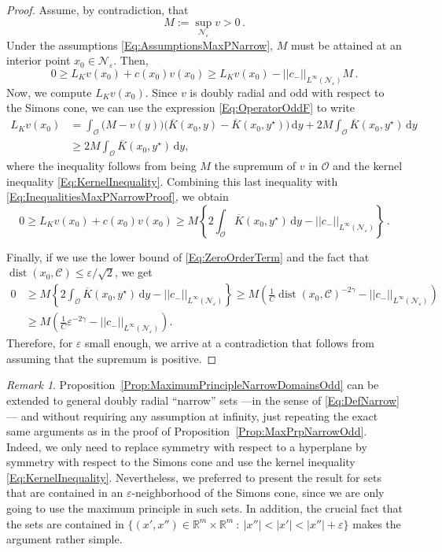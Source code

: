 \documentclass[12pt,reqno]{amsart}
\theoremstyle{definition}
\theoremstyle{remark}
\newtheorem{remark}[theorem]{Remark}
\newcommand{\con}[1]{\mathbb{#1}}
\newcommand{\R}{\con{R}} %
\newcommand{\ccal}{\mathscr{C}}
\newcommand{\ncal}{\mathcal{N}}
\newcommand{\ocal}{\mathcal{O}}
\newcommand{\norm}[1]{\left | \left |{#1} \right | \right |}
\newcommand{\s}{\gamma}
\renewcommand{\d}{\,\mathrm{d}} %
\DeclareMathOperator{\dist}{dist}
\numberwithin{equation}{section}
\begin{document}
\begin{proof}
	Assume, by contradiction, that
	$$
	M := \sup_{\ncal_\varepsilon} v > 0\,.
	$$
	Under the assumptions \eqref{Eq:AssumptionsMaxPNarrow}, $M$ must be attained at an interior point $x_0 \in \ncal_\varepsilon$. Then,
	\begin{equation}
	\label{Eq:InequalitiesMaxPNarrowProof}
	0 \geq L_K  v(x_0) + c(x_0)v(x_0) \geq L_K  v(x_0) - \norm{c_-}_{L^\infty(\ncal_\varepsilon)}M\,.
	\end{equation} 
	Now, we compute $L_K  v(x_0)$. Since $v$ is doubly radial and odd with respect to the Simons cone, we can use the expression \eqref{Eq:OperatorOddF} to write
	\begin{align*}
	L_K v(x_0) &= \int_{\ocal} \big (M - v(y) \big) \big (\overline{K}(x_0,y) -\overline{K}(x_0,y^\star)\big) \d y + 2M\int_{\ocal} \overline{K}(x_0,y^\star)\d y\\
	&\geq2M \int_{\ocal} \overline{K}(x_0,y^\star)\d y,
	\end{align*}
	where the inequality follows from being $M$ the supremum of $v$ in $\ocal$ and the kernel inequality \eqref{Eq:KernelInequality}. Combining this last inequality with \eqref{Eq:InequalitiesMaxPNarrowProof}, we obtain
	$$
	0 \geq L_K  v(x_0) + c(x_0)v(x_0)  \geq M \left\{ 2 \int_{\ocal} \overline{K}(x_0,y^\star)\d y - \norm{c_-}_{L^\infty(\ncal_\varepsilon)}
	\right\}\,.
	$$
	
	Finally, if we use the lower bound of \eqref{Eq:ZeroOrderTerm} and the fact that $\dist(x_0,\ccal) \leq \varepsilon/\sqrt{2}$, we get
	\begin{align*}
	0 &\geq M \left\{ 2 \int_{\ocal} \overline{K}(x_0,y^\star)\d y - \norm{c_-}_{L^\infty(\ncal_\varepsilon)}
	\right\} \geq M \left(\frac{1}{C}\dist(x_0,\ccal)^{-2\s}-\norm{c_-}_{L^\infty(\ncal_\varepsilon)}\right) \\ &\geq M \left(\frac{1}{C}\varepsilon^{-2\s}-\norm{c_-}_{L^\infty(\ncal_\varepsilon)}\right).
	\end{align*}
	Therefore, for $\varepsilon$ small enough, we arrive at a contradiction that follows from assuming that the supremum is positive.
\end{proof}

\begin{remark}
	Proposition~\ref{Prop:MaximumPrincipleNarrowDomainsOdd} can be extended to general doubly radial ``narrow'' sets ---in the sense of \eqref{Eq:DefNarrow}--- and without requiring any assumption at infinity, just repeating the exact same arguments as in the proof of Proposition~\ref{Prop:MaxPrpNarrowOdd}. Indeed, we only need to replace symmetry with respect to a hyperplane by symmetry with respect to the Simons cone and use the kernel inequality \eqref{Eq:KernelInequality}. Nevertheless, we preferred to present the result for sets that are contained in an $\varepsilon$-neighborhood of the Simons cone, since we are only going to use the maximum principle in such sets. In addition, the crucial fact that the sets are contained in $\{(x',x'')\in \R^m\times\R^m \ : \ |x''|<|x'|<|x''|+ \varepsilon\}$ makes the argument rather simple.
\end{remark}
\end{document}
